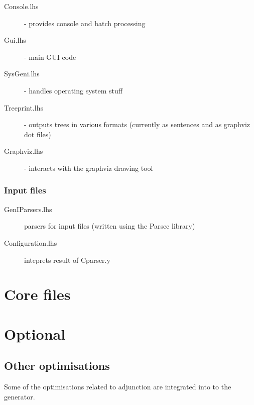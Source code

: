 \documentclass[a4paper,11pt]{report}
\begin{document}
\begin{description}
 \item[Console.lhs] - provides console and batch processing
 \item[Gui.lhs] - main GUI code 
 \item[SysGeni.lhs] - handles operating system stuff
 \item[Treeprint.lhs] - outputs trees in various formats 
                        (currently as sentences and as graphviz dot
                        files)
 \item[Graphviz.lhs] - interacts with the graphviz drawing tool
\end{description}

\section{Input files}

\begin{description}
 \item[GenIParsers.lhs] parsers for input files (written using the
 Parsec library)
 \item[Configuration.lhs] inteprets result of Cparser.y
\end{description}





\part{Core files}

       
       
       
       

\part{Optional}

       
       
% 

\chapter{Other optimisations}
\label{chp:other_optimisations}

Some of the optimisations related to adjunction are integrated into
to the generator.
\end{document}
